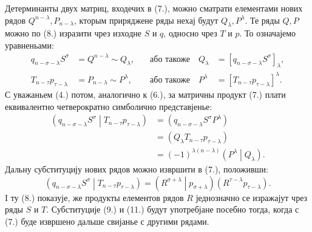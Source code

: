 ﻿\documentclass[11pt]{article}
\newcommand{\pair}[2]{\left(#1\middle|#2\right)}
\begin{document}
Детерминанты двух матриц, входечих в (7.), можно сматрати елементами нових рядов $Q^{n-\lambda},P_{n-\lambda}$, кторым приряджене ряды нехај будут $Q_\lambda,P^\lambda$. Те ряды $Q,P$ можно по (8.) изразити чрез изходне $S$ и $q$, односно чрез $T$ и $p$. То означајемо уравненьами:
\begin{equation}
\begin{aligned}
 q_{n-\sigma-\lambda}S^\sigma&=Q^{n-\lambda}\sim Q_\lambda,
 &\quad\text{або такоже}\quad Q_\lambda&=[q_{n-\sigma-\lambda}S^\sigma]_\lambda,\\
 T_{n-\tau}p_{\tau-\lambda}&=P_{n-\lambda}\sim P^\lambda,
 &\quad\text{або такоже}\quad P^\lambda&=[T_{n-\tau}p_{\tau-\lambda}]^\lambda.
\end{aligned}
\tag{9}
\end{equation}
С уважаньем (4.) потом, аналогично к (6.), за матричны продукт (7.) плати еквивалентно четверократно симболично представјенье:
\begin{equation}
\begin{aligned}
\pair{q_{n-\sigma-\lambda}S^\sigma}{T_{n-\tau}p_{\tau-\lambda}}
&=(q_{n-\sigma-\lambda}S^\sigma P^\lambda)\\
&=(Q_\lambda T_{n-\tau}p_{\tau-\lambda})\\
&=(-1)^{\lambda(n-\lambda)}\pair{P^\lambda}{Q_\lambda}.
\end{aligned}
\tag{10}
\end{equation}
Дальну субституцију нових рядов можно извршити в (7.), положивши:
\begin{equation}
 \pair{q_{n-\sigma-\lambda}S^\sigma}{T_{n-\tau}p_{\tau-\lambda}}
 =\pair{R^{\sigma+\lambda}}{p_{\sigma+\lambda}}(R^{\tau-\lambda}p_{\tau-\lambda}).
\tag{11}
\end{equation}
I ту (8.) показује, же продукты елементов рядов $R$ једнозначно се изражајут чрез ряды $S$ и $T$. Субституције (9.) и (11.) будут употребјане посебно тогда, когда с (7.) буде извршено дальше свијанье с другими рядами.
\end{document}
